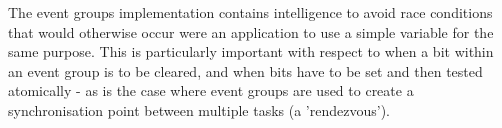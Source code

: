 The event groups implementation contains intelligence to avoid race conditions that would otherwise occur were an application to use a simple variable for the same purpose. This is particularly important with respect to when a bit within an event group is to be cleared, and when bits have to be set and then tested atomically -\/ as is the case where event groups are used to create a synchronisation point between multiple tasks (a 'rendezvous'). 